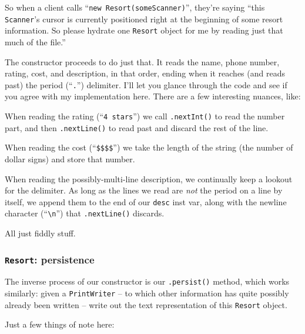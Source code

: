 So when a client calls ``\texttt{new Resort(someScanner)}'', they're saying
``this \texttt{Scanner}'s cursor is currently positioned right at the
beginning of some resort information. So please hydrate one \texttt{Resort}
object for me by reading just that much of the file.''

The constructor proceeds to do just that. It reads the name, phone number,
rating, cost, and description, in that order, ending when it reaches (and
reads past) the period (``\texttt{.}'') delimiter. I'll let you glance through
the code and see if you agree with my implementation here. There are a few
interesting nuances, like:

\begin{compactitem}

\item When reading the rating (``\texttt{4 stars}'') we call
\texttt{.nextInt()} to read the number part, and then \texttt{.nextLine()} to
read past and discard the rest of the line.

\item When reading the cost (``\texttt{\$\$\$\$}'') we take the length of the
string (the number of dollar signs) and store that number.

\item When reading the possibly-multi-line description, we continually keep a
lookout for the delimiter. As long as the lines we read are \textit{not} the
period on a line by itself, we append them to the end of our \texttt{desc}
inst var, along with the newline character (``\texttt{\textbackslash n}'') that
\texttt{.nextLine()} discards.

\end{compactitem}

All just fiddly stuff.

\subsubsection{\texttt{Resort}: persistence}

The inverse process of our constructor is our \texttt{.persist()} method,
which works similarly: given a \texttt{PrintWriter} -- to which other
information has quite possibly already been written -- write out the text
representation of this \texttt{Resort} object.

Just a few things of note here:

